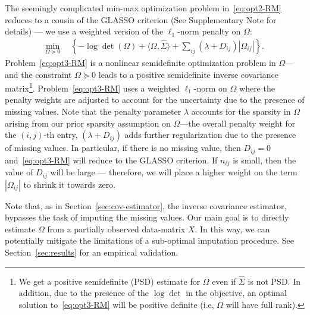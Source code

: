 The seemingly complicated min-max optimization problem in~\eqref{eq:opt2-RM}
reduces to a cousin of the GLASSO criterion (See Supplementary Note for details) --- we use a weighted version of the $\ell_{1}$-norm penalty on $\Omega$: 
\begin{equation}\label{eq:opt3-RM}
    \begin{aligned}
    \min_{\Omega \succeq 0} ~~ & \left \{- \log \det ( \Omega ) + \langle \Omega, \hat{\Sigma} \rangle +  \sum_{ij} (\lambda +  D_{ij})|\Omega_{ij}|  \right \}.
    \end{aligned}
\end{equation}
Problem~\eqref{eq:opt3-RM} is a nonlinear semidefinite optimization problem in $\Omega$---and the constraint $\Omega \succeq 0$ leads to a positive semidefinite inverse covariance matrix\footnote{We get a positive semidefinite (PSD) estimate for $\Omega$ even if $\hat{\Sigma}$ is not PSD. In addition, due to the presence of the $\log\det$ in the objective, an optimal solution to~\eqref{eq:opt3-RM} will be positive definite (i.e, 
$\Omega$ will have full rank).}.
Problem~\eqref{eq:opt3-RM} uses a weighted $\ell_{1}$-norm on $\Omega$ where the penalty weights are adjusted to account for the uncertainty due to the presence of missing values. Note that the penalty parameter $\lambda$ accounts for the sparsity in $\Omega$ arising from our prior sparsity assumption on $\Omega$---the overall penalty weight for the $(i,j)$-th entry, $(\lambda + D_{ij})$ adds further regularization due to the presence of missing values. 
In particular, if there is no missing value, then $D_{ij}=0$ and~\eqref{eq:opt3-RM} will reduce to the GLASSO criterion. If $n_{ij}$ is small, then the value of $D_{ij}$ will be large --- therefore, we will place a higher weight on the term $|\Omega_{ij}|$ to shrink it towards zero. 

Note that, as in Section~\ref{sec:cov-estimator}, the \Robocov{} inverse covariance estimator, bypasses the task of imputing the missing values. Our main goal is to directly estimate $\Omega$ from a partially observed data-matrix $X$. In this way, we can potentially mitigate the limitations of a sub-optimal imputation procedure. See Section~\ref{sec:results} for an empirical validation. 

